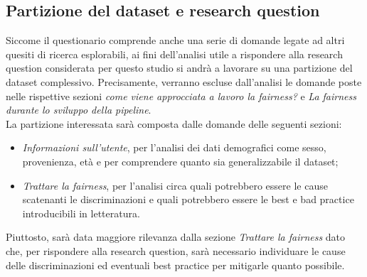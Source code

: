 \subsection{Partizione del dataset e research question}
Siccome il questionario comprende anche una serie di domande legate ad altri quesiti di ricerca esplorabili, ai fini dell'analisi utile a rispondere alla research question considerata per questo studio si andrà a lavorare su una partizione del dataset complessivo. Precisamente, verranno escluse dall'analisi le domande poste nelle rispettive sezioni \emph{come viene approcciata a lavoro la fairness?} e \emph{La fairness durante lo sviluppo della pipeline}.\\
La partizione interessata sarà composta dalle domande delle seguenti sezioni:
\begin{itemize}
    \item\emph{Informazioni sull'utente}, per l'analisi dei dati demografici come sesso, provenienza, età e per comprendere quanto sia generalizzabile il dataset;
    \item\emph{Trattare la fairness}, per l'analisi circa quali potrebbero essere le cause scatenanti le discriminazioni e quali potrebbero essere le best e bad practice introducibili in letteratura.
\end{itemize}
Piuttosto, sarà data maggiore rilevanza dalla sezione \emph{Trattare la fairness} dato che, per rispondere alla research question, sarà necessario individuare le cause delle discriminazioni ed eventuali best practice per mitigarle quanto possibile.
